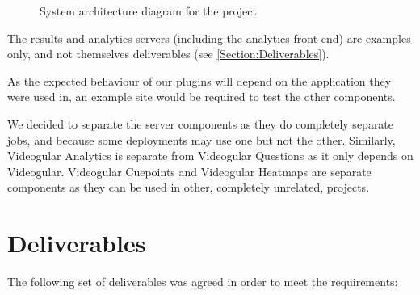 \begin{figure}[h!]
\centering

\caption{System architecture diagram for the project \label{fig:System architecture diagram}}
\end{figure}

The results and analytics servers (including the analytics front-end) are examples only, and not themselves deliverables (see \autoref{Section:Deliverables}).

As the expected behaviour of our plugins will depend on the application they were used in, an example site would be required to test the other components.


We decided to separate the server components as they do completely separate jobs, and because some deployments may use one but not the other. Similarly, Videogular Analytics is separate from Videogular Questions as it only depends on \gls{Videogular}. Videogular Cuepoints and Videogular Heatmaps are separate components as they can be used in other, completely unrelated, projects.

\section{Deliverables}
\label{Section:Deliverables}

The following set of deliverables was agreed in order to meet the requirements:


